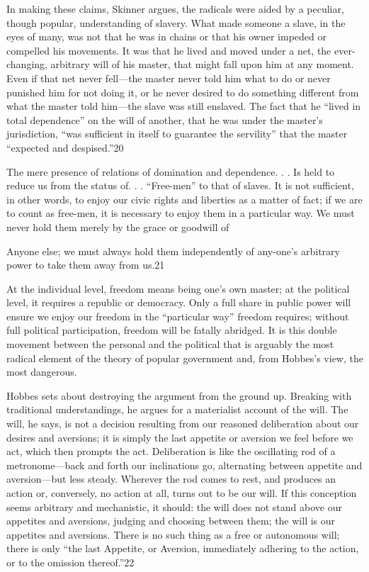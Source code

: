  \par 
In making these claims, Skinner argues, the radicals were aided by a peculiar, though popular, understanding of slavery. What made someone a slave, in the eyes of many, was not that he was in chains or that his owner impeded or compelled his movements. It was that he lived and moved under a net, the ever-changing, arbitrary will of his master, that might fall upon him at any moment. Even if that net never fell—the master never told him what to do or never punished him for not doing it, or he never desired to do something different from what the master told him—the slave was still enslaved. The fact that he “lived in total dependence” on the will of another, that he was under the master’s jurisdiction, “was sufficient in itself to guarantee the servility” that the master “expected and despised.”{\color{blue}20}
 \par 
The mere presence of relations of domination and dependence. . . Is held to reduce us from the status of. . . “Free-men” to that of slaves. It is not sufficient, in other words, to enjoy our civic rights and liberties as a matter of fact; if we are to count as free-men, it is necessary to enjoy them in a particular way. We must never hold them merely by the grace or goodwill of
 \par 
Anyone else; we must always hold them independently of any-one’s arbitrary power to take them away from us.{\color{blue}21}
 \par 
At the individual level, freedom means being one’s own master; at the political level, it requires a republic or democracy. Only a full share in public power will ensure we enjoy our freedom in the “particular way” freedom requires; without full political participation, freedom will be fatally abridged. It is this double movement between the personal and the political that is arguably the most radical element of the theory of popular government and, from Hobbes’s view, the most dangerous.
 \par 
Hobbes sets about destroying the argument from the ground up. Breaking with traditional understandings, he argues for a materialist account of the will. The will, he says, is not a decision resulting from our reasoned deliberation about our desires and aversions; it is simply the last appetite or aversion we feel before we act, which then prompts the act. Deliberation is like the oscillating rod of a metronome—back and forth our inclinations go, alternating between appetite and aversion—but less steady. Wherever the rod comes to rest, and produces an action or, conversely, no action at all, turns out to be our will. If this conception seems arbitrary and mechanistic, it should: the will does not stand above our appetites and aversions, judging and choosing between them; the will is our appetites and aversions. There is no such thing as a free or autonomous will; there is only “the last Appetite, or Aversion, immediately adhering to the action, or to the omission thereof.”{\color{blue}22}
